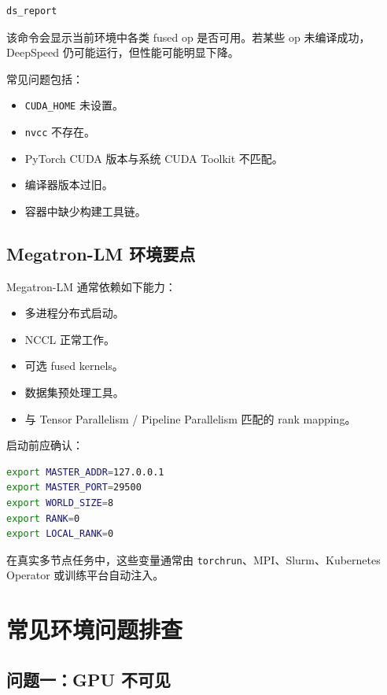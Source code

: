 \begin{lstlisting}[language=bash,caption={DeepSpeed 环境检查},label={lst:deepspeed-env-report}]
ds_report
\end{lstlisting}

该命令会显示当前环境中各类 fused op 是否可用。若某些 op 未编译成功，DeepSpeed 仍可能运行，但性能可能明显下降。

常见问题包括：

\begin{itemize}
\item \texttt{CUDA_HOME} 未设置。
\item \texttt{nvcc} 不存在。
\item PyTorch CUDA 版本与系统 CUDA Toolkit 不匹配。
\item 编译器版本过旧。
\item 容器中缺少构建工具链。
\end{itemize}

\subsection{Megatron-LM 环境要点}

Megatron-LM 通常依赖如下能力：

\begin{itemize}
\item 多进程分布式启动。
\item NCCL 正常工作。
\item 可选 fused kernels。
\item 数据集预处理工具。
\item 与 Tensor Parallelism / Pipeline Parallelism 匹配的 rank mapping。
\end{itemize}

启动前应确认：

\begin{lstlisting}[language=bash,caption={分布式启动基础环境变量},label={lst:distributed-env-vars}]
export MASTER_ADDR=127.0.0.1
export MASTER_PORT=29500
export WORLD_SIZE=8
export RANK=0
export LOCAL_RANK=0
\end{lstlisting}

在真实多节点任务中，这些变量通常由 \texttt{torchrun}、MPI、Slurm、Kubernetes Operator 或训练平台自动注入。

\section{常见环境问题排查}

\subsection{问题一：GPU 不可见}

